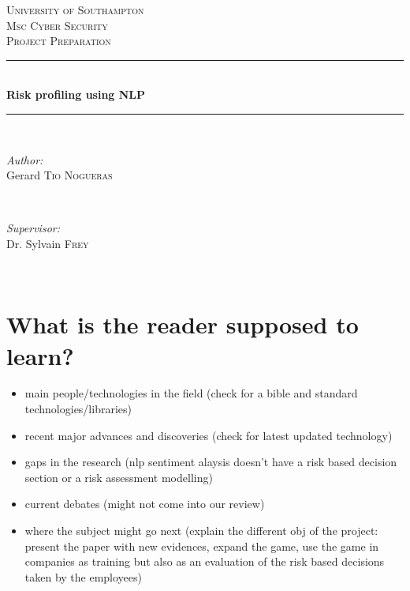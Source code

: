 \documentclass[9pt]{article}
\begin{document}

\begin{titlepage}

\newcommand{\HRule}{\rule{\linewidth}{0.5mm}}
\center
\textsc{\LARGE University of Southampton}\\[1.5cm]
\textsc{\Large Msc Cyber Security}\\[0.5cm]
\textsc{\large Project Preparation}\\[0.5cm]
\HRule \\[0.4cm]
{ \huge \bfseries Risk profiling using NLP }\\[0.4cm]
\HRule \\[1.5cm]

\begin{minipage}{0.4\textwidth}
\begin{flushleft} \large
\emph{Author:}\\
Gerard \textsc{Tio Nogueras}
\end{flushleft}
\end{minipage}
~
\begin{minipage}{0.4\textwidth}
\begin{flushright} \large
\emph{Supervisor:} \\
Dr. Sylvain \textsc{Frey}
\end{flushright}
\end{minipage}\\[4cm]


\vfill
\end{titlepage}
\section{What is the reader supposed to learn?}
\begin{itemize}
\item main people/technologies in the field (check for a bible and standard technologies/libraries)
\item recent major advances and discoveries (check for latest updated technology)
\item gaps in the research (nlp sentiment alaysis doesn't have a risk based decision section or a risk assessment modelling)
\item current debates (might not come into our review)
\item where the subject might go next (explain the different obj of the project: present the paper with new evidences, expand the game, use the game in companies as training but also as an evaluation of the risk based decisions taken by the employees)
\end{itemize}
\end{document}
